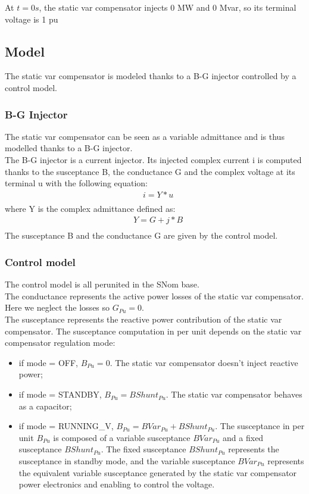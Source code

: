\documentclass[a4paper, 12pt]{report}
\begin{document}
At $t=0s$, the static var compensator injects 0 MW and 0 Mvar, so its terminal voltage is 1 pu

\subsection{Model}

The static var compensator is modeled thanks to a B-G injector controlled by a control model.

\subsubsection{B-G Injector}
The static var compensator can be seen as a variable admittance and is thus modelled thanks to a B-G injector.\\

The B-G injector is a current injector. Its injected complex current i is computed thanks to the susceptance B, the conductance G and the complex voltage at its terminal u with the following equation:
\[
\begin{aligned}
& i = Y*u \\
\end{aligned}
\]
where Y is the complex admittance defined as:
\[
\begin{aligned}
& Y = G + j*B \\
\end{aligned}
\]
The susceptance B and the conductance G are given by the control model.

\subsubsection{Control model}

The control model is all perunited in the SNom base.\\

The conductance represents the active power losses of the static var compensator. Here we neglect the losses so $G_{Pu} = 0$.\\

The susceptance represents the reactive power contribution of the static var compensator. The susceptance computation in per unit depends on the static var compensator regulation mode:

\begin{itemize}
\item if mode = OFF, $B_{Pu} = 0$. The static var compensator doesn't inject reactive power;
\item if mode = STANDBY, $B_{Pu} = BShunt_{Pu}$.
The static var compensator behaves as a  capacitor;
\item if mode = RUNNING\_V, $B_{Pu} = BVar_{Pu} + BShunt_{Pu}$. The susceptance in per unit $B_{Pu}$ is composed of a variable susceptance $BVar_{Pu}$ and a fixed susceptance $BShunt_{Pu}$. The fixed susceptance $BShunt_{Pu}$ represents the susceptance in standby mode, and the variable susceptance $BVar_{Pu}$ represents the equivalent variable susceptance generated by the static var compensator power electronics and enabling to control the voltage.
\end{itemize}
\end{document}

